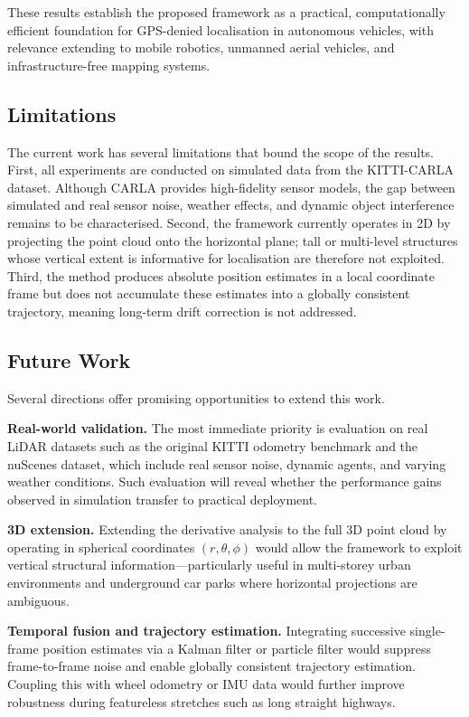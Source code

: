 \documentclass[lettersize,journal]{IEEEtran}
\begin{document}
These results establish the proposed framework as a practical, computationally
efficient foundation for GPS-denied localisation in autonomous vehicles, with
relevance extending to mobile robotics, unmanned aerial vehicles, and
infrastructure-free mapping systems.

\subsection{Limitations}

The current work has several limitations that bound the scope of the results.
First, all experiments are conducted on simulated data from the KITTI-CARLA
dataset. Although CARLA provides high-fidelity sensor models, the gap between
simulated and real sensor noise, weather effects, and dynamic object interference
remains to be characterised. Second, the framework currently operates in 2D by
projecting the point cloud onto the horizontal plane; tall or multi-level
structures whose vertical extent is informative for localisation are therefore
not exploited. Third, the method produces absolute position estimates in a local
coordinate frame but does not accumulate these estimates into a globally
consistent trajectory, meaning long-term drift correction is not addressed.

\subsection{Future Work}

Several directions offer promising opportunities to extend this work.

\textbf{Real-world validation.} The most immediate priority is evaluation on
real LiDAR datasets such as the original KITTI odometry benchmark
\cite{geiger2012kitti} and the nuScenes dataset, which include real sensor
noise, dynamic agents, and varying weather conditions. Such evaluation will
reveal whether the performance gains observed in simulation transfer to
practical deployment.

\textbf{3D extension.} Extending the derivative analysis to the full 3D point
cloud by operating in spherical coordinates $(r, \theta, \phi)$ would allow
the framework to exploit vertical structural information---particularly useful
in multi-storey urban environments and underground car parks where horizontal
projections are ambiguous.

\textbf{Temporal fusion and trajectory estimation.} Integrating successive
single-frame position estimates via a Kalman filter or particle filter would
suppress frame-to-frame noise and enable globally consistent trajectory
estimation. Coupling this with wheel odometry or IMU data would further
improve robustness during featureless stretches such as long straight
highways.
\end{document}
